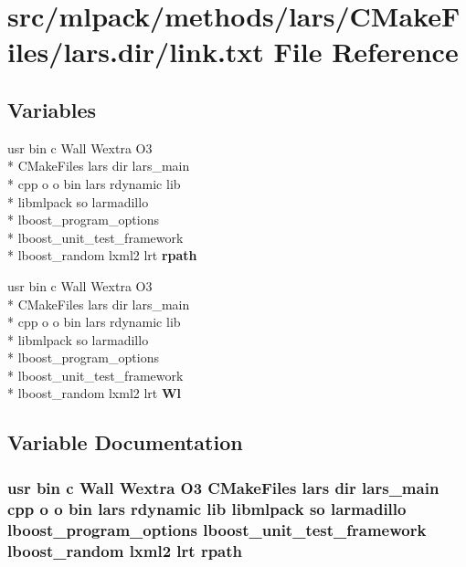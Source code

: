 \section{src/mlpack/methods/lars/\-C\-Make\-Files/lars.dir/link.txt File Reference}
\label{methods_2lars_2CMakeFiles_2lars_8dir_2link_8txt}
\subsection*{Variables}
\begin{DoxyCompactItemize}
\item 
usr bin c Wall Wextra O3 \\*
C\-Make\-Files lars dir lars\-\_\-main \\*
cpp o o bin lars rdynamic lib \\*
libmlpack so larmadillo \\*
lboost\-\_\-program\-\_\-options \\*
lboost\-\_\-unit\-\_\-test\-\_\-framework \\*
lboost\-\_\-random lxml2 lrt {\bf rpath}
\item 
usr bin c Wall Wextra O3 \\*
C\-Make\-Files lars dir lars\-\_\-main \\*
cpp o o bin lars rdynamic lib \\*
libmlpack so larmadillo \\*
lboost\-\_\-program\-\_\-options \\*
lboost\-\_\-unit\-\_\-test\-\_\-framework \\*
lboost\-\_\-random lxml2 lrt {\bf Wl}
\end{DoxyCompactItemize}


\subsection{Variable Documentation}
\subsubsection[{rpath}]{\setlength{\rightskip}{0pt plus 5cm}usr bin c Wall Wextra O3 C\-Make\-Files lars dir lars\-\_\-main cpp o o bin lars rdynamic lib libmlpack so larmadillo lboost\-\_\-program\-\_\-options lboost\-\_\-unit\-\_\-test\-\_\-framework lboost\-\_\-random lxml2 lrt rpath}\label{methods_2lars_2CMakeFiles_2lars_8dir_2link_8txt_a772ec553d9dbdeca6d60c9f1e88f67d6}


